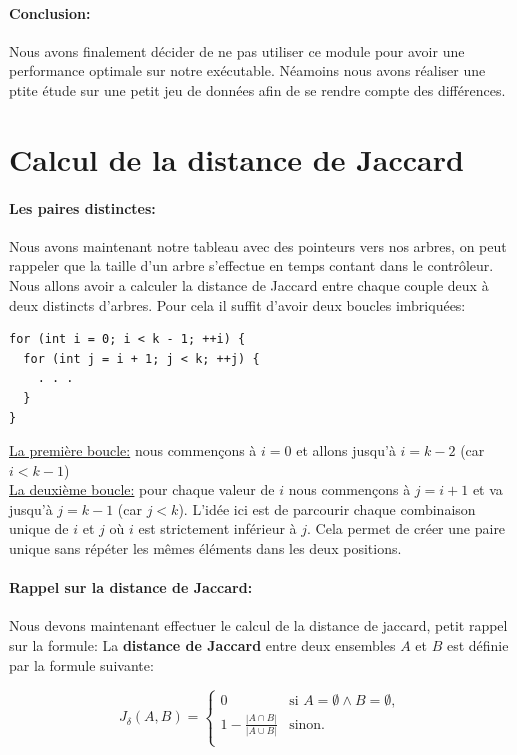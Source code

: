 \documentclass{article}
\begin{document}
\paragraph{Conclusion:}
Nous avons finalement décider de ne pas utiliser ce module pour avoir une performance optimale sur notre exécutable.
Néamoins nous avons réaliser une ptite étude sur une petit jeu de données afin de se rendre compte des différences.

\section{Calcul de la distance de Jaccard}\label{subsec:jdis}
\paragraph{Les paires distinctes:}
Nous avons maintenant notre tableau avec des pointeurs vers nos arbres, on peut
rappeler que la taille d'un arbre s'effectue en temps contant dans le contrôleur.
Nous allons avoir a calculer la distance de Jaccard entre chaque couple deux à deux
distincts d'arbres. Pour cela il suffit d'avoir deux boucles imbriquées: 

\begin{lstlisting}[style=Cstyle]
for (int i = 0; i < k - 1; ++i) {
  for (int j = i + 1; j < k; ++j) {
    . . .
  }
}  
\end{lstlisting}
\underline{La première boucle:} nous commençons à $i = 0$ et allons jusqu'à $i = k - 2$ (car $i < k - 1$)\\
\underline{La deuxième boucle:} pour chaque valeur de $i$ nous commençons à $j = i + 1$ et va 
jusqu'à $j = k - 1$ (car $j < k$).
L'idée ici est de parcourir chaque combinaison unique de $i$ et $j$ où $i$ est strictement inférieur à $j$. 
Cela permet de créer une paire unique sans répéter les mêmes éléments dans les deux positions.

\paragraph{Rappel sur la distance de Jaccard:}
Nous devons maintenant effectuer le calcul de la distance de jaccard, petit rappel sur la formule:
La \textbf{distance de Jaccard} entre deux ensembles \( A \) et \( B \) est définie par la formule suivante:

\[
J_{\delta}(A, B) = 
\begin{cases} 
0 & \text{si } A = \emptyset \wedge B = \emptyset, \\
1 - \frac{|A \cap B|}{|A \cup B|} & \text{sinon.} \\
\end{cases}
\]
\end{document}

